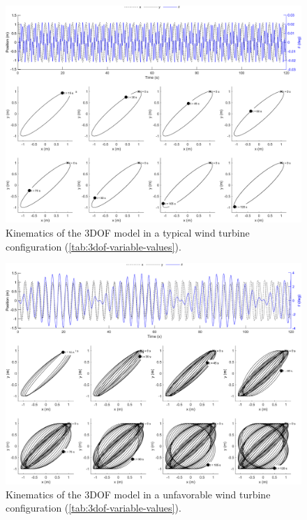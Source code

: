 \documentclass{article}
\begin{document}
\begin{figure}
    \centering
    \includegraphics[width=1\textwidth]{figures/turbine_typical.png}
    \caption{Kinematics of the 3DOF model in a typical wind turbine configuration (\autoref{tab:3dof-variable-values}).}
    \label{fig:3dof-turbine-typical}
\end{figure}

\begin{figure}
    \centering
    \includegraphics[width=1\textwidth]{figures/turbine_unfavorable.png}
    \caption{Kinematics of the 3DOF model in a unfavorable wind turbine configuration (\autoref{tab:3dof-variable-values}).}
    \label{fig:3dof-turbine-unfavorable}
\end{figure}
\end{document}
